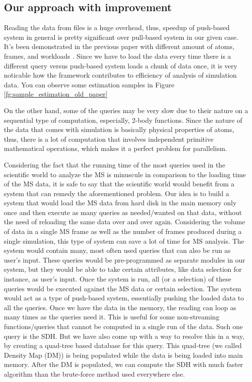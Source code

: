 \documentclass[10pt,journal,final,letterpaper,twocolumn]{IEEEtran}
\begin{document}
\subsection{Our approach with improvement}

Reading the data from files is a huge overhead, thus, speedup of push-based system in general is pretty significant over pull-based system in our given case. 
It's been demonstrated in the previous paper with different amount of atoms, frames, and workloads \cite{mainPaper}. Since we have to load the data every time there is a different query versus push-based system loads a chunk of data once, it is very noticable how the framework \cite{mainPaper} contributes to efficiency of analysis of simulation data. You can observe some estimation samples in Figure \ref{fg:sample_estimation_old_paper}

On the other hand, some of the queries may be very slow due to their nature on a sequential type of computation,  especially, 2-body functions. Since the nature of the data that comes with simulation is basically physical properties of atoms, thus, there is a lot of computation that involves independent primitive mathematical operations, which makes it a perfect problem for parallelism.


Considering the fact that the running time of the most queries used
in the scientific world to analyze the MS is minuscule in comparison
to the loading time of the MS data, it is safe to say that the
scientific world would benefit from a system that can remedy the
aforementioned problem. Our idea is to build a system that would
load the MS data from hard disk in the main memory only once and
then execute as many queries as needed/wanted on that data, without
the need of reloading the same data over and over again. Considering
the volume of data in a single MS frame as well as the number of
frames produced during a single simulation, this type of system can
save a lot of time for MS analysis. The system would contain many,
most often used queries that can also be run as user's input. These
queries would be pre-programmed as separate modules in our system,
but they would be able to take certain attributes, like data
selection for instance, as user's input. Once the system is run, all
(or a selection) of these queries would be executed against the MS
data or certain selection. The system would act as a type of
push-based system, essentially pushing the loaded data to all the
queries. Once we have the data in the memory, the reading can loop
as many times as the queries need it. This is useful for some
non-streaming functions/queries that cannot be computed in a single
run of the data. Such one query is the SDH. But we have also come up
with a way to resolve this in a way, by creating a quad-tree based
database for this query. This quad-tree (we called Density Map (DM))
is being populated while the data is being loaded into main memory.
After the DM is populated, we can compute the SDH with much faster
algorithm than the brute-force method used everywhere else.
\end{document}
